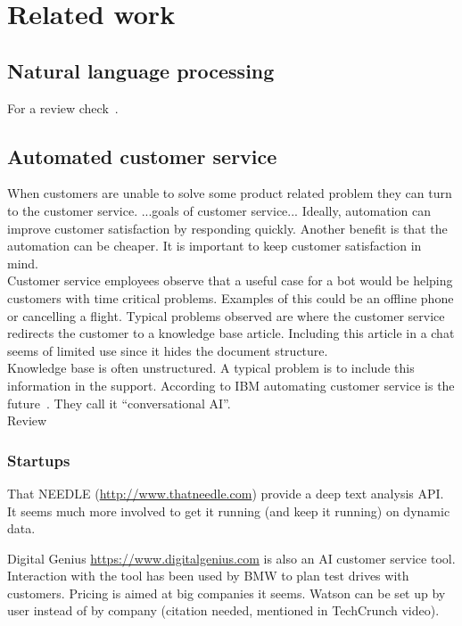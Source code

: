 \chapter{Related work}
\label{ch:related_work}

\section{Natural language processing}
\label{sec:natural_language_processing}
For a review check~\cite{chowdhury2003natural}.


\section{Automated customer service}
\label{sec:automated_customer_service}
When customers are unable to solve some product related problem they can turn to the customer service. ...goals of customer service...
Ideally, automation can improve customer satisfaction by responding quickly.
Another benefit is that the automation can be cheaper.
It is important to keep customer satisfaction in mind. \\

Customer service employees observe that a useful case for a bot would be helping customers with time critical problems.
Examples of this could be an offline phone or cancelling a flight.
Typical problems observed are where the customer service redirects the customer to a knowledge base article.
Including this article in a chat seems of limited use since it hides the document structure. \\

Knowledge base is often unstructured.
A typical problem is to include this information in the support.
According to IBM automating customer service is the future~\cite{schneider2017ai}.
They call it ``conversational AI''.\\

Review~\cite{braun2017}

\subsection{Startups}
\label{subsec:startups}
That NEEDLE (\url{http://www.thatneedle.com}) provide a deep text analysis API. It seems much more involved to get it running (and keep it running) on dynamic data. 

Digital Genius \url{https://www.digitalgenius.com} is also an AI customer service tool.
Interaction with the tool has been used by BMW to plan test drives with customers.
Pricing is aimed at big companies it seems.
Watson can be set up by user instead of by company (citation needed, mentioned in TechCrunch video). \\

